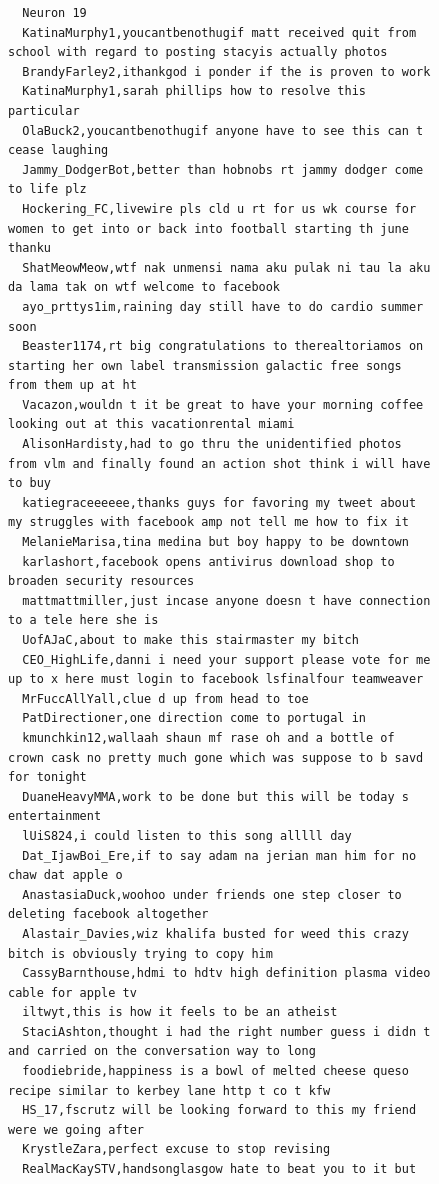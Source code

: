 \begin{figure}[htpb]
\begin{verbatim}
  Neuron 19
  KatinaMurphy1,youcantbenothugif matt received quit from school with regard to posting stacyis actually photos
  BrandyFarley2,ithankgod i ponder if the is proven to work
  KatinaMurphy1,sarah phillips how to resolve this particular
  OlaBuck2,youcantbenothugif anyone have to see this can t cease laughing
  Jammy_DodgerBot,better than hobnobs rt jammy dodger come to life plz
  Hockering_FC,livewire pls cld u rt for us wk course for women to get into or back into football starting th june thanku
  ShatMeowMeow,wtf nak unmensi nama aku pulak ni tau la aku da lama tak on wtf welcome to facebook
  ayo_prttys1im,raining day still have to do cardio summer soon
  Beaster1174,rt big congratulations to therealtoriamos on starting her own label transmission galactic free songs from them up at ht
  Vacazon,wouldn t it be great to have your morning coffee looking out at this vacationrental miami
  AlisonHardisty,had to go thru the unidentified photos from vlm and finally found an action shot think i will have to buy
  katiegraceeeeee,thanks guys for favoring my tweet about my struggles with facebook amp not tell me how to fix it
  MelanieMarisa,tina medina but boy happy to be downtown
  karlashort,facebook opens antivirus download shop to broaden security resources
  mattmattmiller,just incase anyone doesn t have connection to a tele here she is
  UofAJaC,about to make this stairmaster my bitch
  CEO_HighLife,danni i need your support please vote for me up to x here must login to facebook lsfinalfour teamweaver
  MrFuccAllYall,clue d up from head to toe
  PatDirectioner,one direction come to portugal in
  kmunchkin12,wallaah shaun mf rase oh and a bottle of crown cask no pretty much gone which was suppose to b savd for tonight
  DuaneHeavyMMA,work to be done but this will be today s entertainment
  lUiS824,i could listen to this song alllll day
  Dat_IjawBoi_Ere,if to say adam na jerian man him for no chaw dat apple o
  AnastasiaDuck,woohoo under friends one step closer to deleting facebook altogether
  Alastair_Davies,wiz khalifa busted for weed this crazy bitch is obviously trying to copy him
  CassyBarnthouse,hdmi to hdtv high definition plasma video cable for apple tv
  iltwyt,this is how it feels to be an atheist
  StaciAshton,thought i had the right number guess i didn t and carried on the conversation way to long
  foodiebride,happiness is a bowl of melted cheese queso recipe similar to kerbey lane http t co t kfw
  HS_17,fscrutz will be looking forward to this my friend were we going after
  KrystleZara,perfect excuse to stop revising
  RealMacKaySTV,handsonglasgow hate to beat you to it but

\end{verbatim}
\end{figure}
